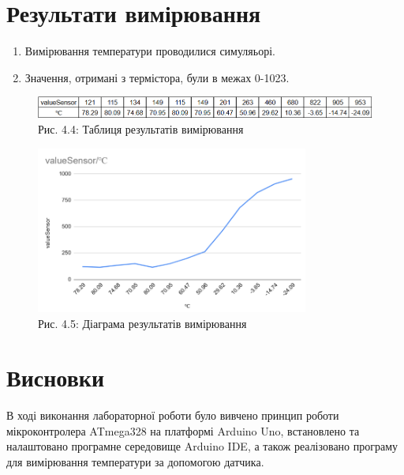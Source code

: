 \documentclass[a4paper]{article}
\begin{document}
\section*{Результати вимірювання}
\begin{enumerate}
    \item Вимірювання температури проводилися симуляьорі.
    \item Значення, отримані з термістора, були в межах 0-1023.
\end{enumerate}

\begin{figure}[h]
  \centering
  \includegraphics[width=1\textwidth]{imgs/LW4.2.png}
  \caption*{Рис. 4.4: Таблиця результатів вимірювання}
\end{figure} 


\begin{figure}[h]
  \centering
  \includegraphics[width=0.8\textwidth]{imgs/LW4.3.png}
  \caption*{Рис. 4.5: Діаграма результатів вимірювання}
\end{figure} 


\section*{Висновки}
В ході виконання лабораторної роботи було вивчено принцип роботи мікроконтролера ATmega328 на платформі Arduino Uno, встановлено та налаштовано програмне середовище Arduino IDE, а також реалізовано програму для вимірювання температури за допомогою датчика.
\end{document}
